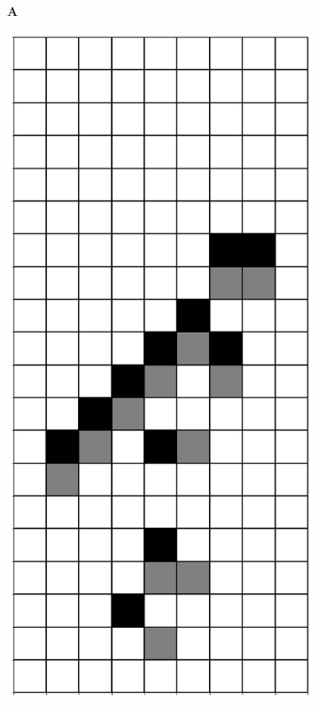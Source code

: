 \documentclass[12pt]{article}
\numberwithin{figure}{section} %
\begin{document}
\begin{figure}[H]
\begin{subfigure}{0.3\textwidth}
     		\subcaption{}
   	\end{subfigure}
      	\newline
	\begin{subfigure}[t]{0.03\textwidth}
    		\textbf{A}
  	\end{subfigure}	
   	\begin{subfigure}{0.3\textwidth}
     		\centering
     		\includegraphics[angle=270,width=\linewidth]{Section4/22.3}

\end{subfigure}
\end{figure}
\end{document}
